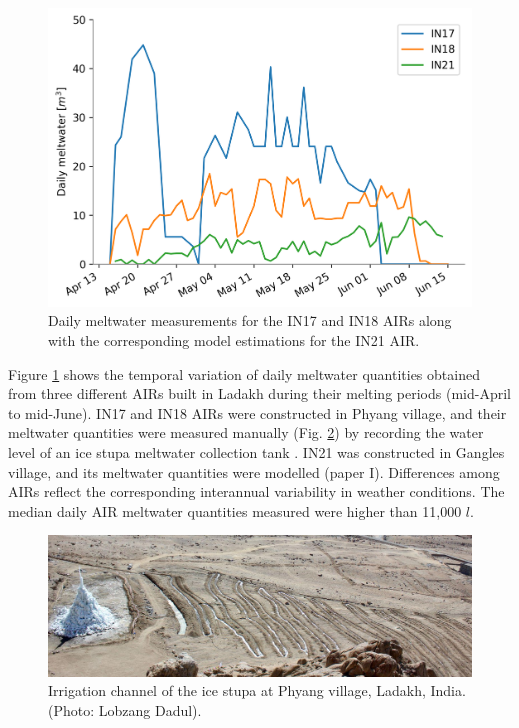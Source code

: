 \begin{figure}
	\centering
	\includegraphics[width=\textwidth]{figs/melt.png}
	\caption{Daily meltwater measurements for the IN17 and IN18 \ac{AIRs} along with the corresponding model estimations
		for the IN21 \ac{AIR}. }
	\label{fig:ISmelt}
\end{figure}




Figure \ref{fig:ISmelt} shows the temporal variation of daily meltwater quantities obtained from three different
AIRs built in Ladakh during their melting periods (mid-April to mid-June). IN17 and IN18 \ac{AIRs} were constructed
in Phyang village, and their meltwater quantities were measured manually (Fig. \ref{fig:ISirrigation}) by recording the water level of an ice stupa meltwater collection tank
\citep{vermaIceStupaMeltwater2018}. IN21 was constructed in Gangles village, and its meltwater quantities
were modelled (paper I). Differences among \ac{AIRs} reflect the corresponding interannual variability in weather
conditions. The median daily \ac{AIR} meltwater quantities measured were higher than 11,000 $l$.

\begin{figure}
	\centering
	\includegraphics[width=\textwidth]{figs/IS_irrigation.jpeg}
	\caption{Irrigation channel of the ice stupa at Phyang village, Ladakh, India. (Photo: Lobzang Dadul). }
	\label{fig:ISirrigation}
\end{figure}

